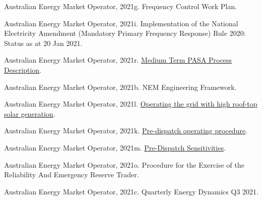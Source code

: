\documentclass[12pt,a4paper,]{report}
\newlength{\cslhangindent}
\newenvironment{CSLReferences}[2] %
 {%
  \setlength{\parindent}{0pt}
  \ifodd #1 \everypar{\setlength{\hangindent}{\cslhangindent}}\ignorespaces\fi
  \ifnum #2 > 0
  \setlength{\parskip}{#2\baselineskip}
  \fi
 }%
 {}
\begin{document}
\begin{CSLReferences}{1}{0}
\leavevmode{}%
Australian Energy Market Operator, 2021g. Frequency {Control Work Plan}.

\leavevmode{}%
Australian Energy Market Operator, 2021i. Implementation of the
{National Electricity Amendment} ({Mandatory Primary Frequency
Response}) {Rule} 2020: {Status} as at 20 {Jan} 2021.

\leavevmode{}%
Australian Energy Market Operator, 2021r.
\href{https://aemo.com.au/-/media/files/electricity/nem/planning_and_forecasting/pasa/mt-pasa-process-description-v62.pdf?la=en}{Medium
{Term PASA Process Description}}.

\leavevmode{}%
Australian Energy Market Operator, 2021b. {NEM Engineering Framework}.

\leavevmode{}%
Australian Energy Market Operator, 2021l.
\href{https://www.aemo.com.au/-/media/files/electricity/nem/security_and_reliability/power_system_ops/consumer-fact-sheet.pdf}{Operating
the grid with high roof-top solar generation}.

\leavevmode{}%
Australian Energy Market Operator, 2021k.
\href{https://www.aemo.com.au/-/media/files/electricity/nem/security_and_reliability/power_system_ops/procedures/so_op_3704-predispatch.pdf?la=en}{Pre-dispatch
operating procedure}.

\leavevmode{}%
Australian Energy Market Operator, 2021m.
\href{https://www.aemo.com.au/-/media/files/electricity/nem/security_and_reliability/dispatch/policy_and_process/pre-dispatch-sensitivities.pdf}{Pre-{Dispatch
Sensitivities}}.

\leavevmode{}%
Australian Energy Market Operator, 2021o. Procedure for the {Exercise}
of the {Reliability And Emergency Reserve Trader}.

\leavevmode{}%
Australian Energy Market Operator, 2021c. Quarterly {Energy Dynamics Q3}
2021.


\end{CSLReferences}
\end{document}
